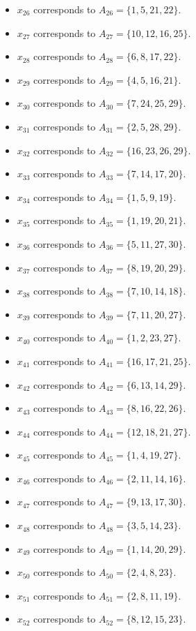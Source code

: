 \documentclass[11pt]{article}
\begin{document}
\begin{itemize}
\item $x_{26}$ corresponds to $A_{26}=\{1, 5, 21, 22\}$.
\item $x_{27}$ corresponds to $A_{27}=\{10, 12, 16, 25\}$.
\item $x_{28}$ corresponds to $A_{28}=\{6, 8, 17, 22\}$.
\item $x_{29}$ corresponds to $A_{29}=\{4, 5, 16, 21\}$.
\item $x_{30}$ corresponds to $A_{30}=\{7, 24, 25, 29\}$.
\item $x_{31}$ corresponds to $A_{31}=\{2, 5, 28, 29\}$.
\item $x_{32}$ corresponds to $A_{32}=\{16, 23, 26, 29\}$.
\item $x_{33}$ corresponds to $A_{33}=\{7, 14, 17, 20\}$.
\item $x_{34}$ corresponds to $A_{34}=\{1, 5, 9, 19\}$.
\item $x_{35}$ corresponds to $A_{35}=\{1, 19, 20, 21\}$.
\item $x_{36}$ corresponds to $A_{36}=\{5, 11, 27, 30\}$.
\item $x_{37}$ corresponds to $A_{37}=\{8, 19, 20, 29\}$.
\item $x_{38}$ corresponds to $A_{38}=\{7, 10, 14, 18\}$.
\item $x_{39}$ corresponds to $A_{39}=\{7, 11, 20, 27\}$.
\item $x_{40}$ corresponds to $A_{40}=\{1, 2, 23, 27\}$.
\item $x_{41}$ corresponds to $A_{41}=\{16, 17, 21, 25\}$.
\item $x_{42}$ corresponds to $A_{42}=\{6, 13, 14, 29\}$.
\item $x_{43}$ corresponds to $A_{43}=\{8, 16, 22, 26\}$.
\item $x_{44}$ corresponds to $A_{44}=\{12, 18, 21, 27\}$.
\item $x_{45}$ corresponds to $A_{45}=\{1, 4, 19, 27\}$.
\item $x_{46}$ corresponds to $A_{46}=\{2, 11, 14, 16\}$.
\item $x_{47}$ corresponds to $A_{47}=\{9, 13, 17, 30\}$.
\item $x_{48}$ corresponds to $A_{48}=\{3, 5, 14, 23\}$.
\item $x_{49}$ corresponds to $A_{49}=\{1, 14, 20, 29\}$.
\item $x_{50}$ corresponds to $A_{50}=\{2, 4, 8, 23\}$.
\item $x_{51}$ corresponds to $A_{51}=\{2, 8, 11, 19\}$.
\item $x_{52}$ corresponds to $A_{52}=\{8, 12, 15, 23\}$.

\end{itemize}
\end{document}
